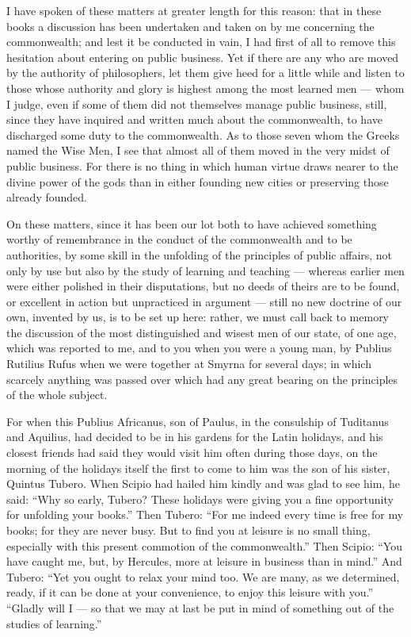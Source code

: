  I have spoken of these matters at greater length for this reason: that in these books a discussion has been undertaken and taken on by me concerning the commonwealth; and lest it be conducted in vain, I had first of all to remove this hesitation about entering on public business. Yet if there are any who are moved by the authority of philosophers, let them give heed for a little while and listen to those whose authority and glory is highest among the most learned men --- whom I judge, even if some of them did not themselves manage public business, still, since they have inquired and written much about the commonwealth, to have discharged some duty to the commonwealth. As to those seven whom the Greeks named the Wise Men, I see that almost all of them moved in the very midst of public business. For there is no thing in which human virtue draws nearer to the divine power of the gods than in either founding new cities or preserving those already founded.

 On these matters, since it has been our lot both to have achieved something worthy of remembrance in the conduct of the commonwealth and to be authorities, by some skill in the unfolding of the principles of public affairs, not only by use but also by the study of learning and teaching --- whereas earlier men were either polished in their disputations, but no deeds of theirs are to be found, or excellent in action but unpracticed in argument --- still no new doctrine of our own, invented by us, is to be set up here: rather, we must call back to memory the discussion of the most distinguished and wisest men of our state, of one age, which was reported to me, and to you when you were a young man, by Publius Rutilius Rufus when we were together at Smyrna for several days; in which scarcely anything was passed over which had any great bearing on the principles of the whole subject.

 For when this Publius Africanus, son of Paulus, in the consulship of Tuditanus and Aquilius, had decided to be in his gardens for the Latin holidays, and his closest friends had said they would visit him often during those days, on the morning of the holidays itself the first to come to him was the son of his sister, Quintus Tubero. When Scipio had hailed him kindly and was glad to see him, he said: ``Why so early, Tubero? These holidays were giving you a fine opportunity for unfolding your books.'' Then Tubero: ``For me indeed every time is free for my books; for they are never busy. But to find you at leisure is no small thing, especially with this present commotion of the commonwealth.'' Then Scipio: ``You have caught me, but, by Hercules, more at leisure in business than in mind.'' And Tubero: ``Yet you ought to relax your mind too. We are many, as we determined, ready, if it can be done at your convenience, to enjoy this leisure with you.'' ``Gladly will I --- so that we may at last be put in mind of something out of the studies of learning.''

